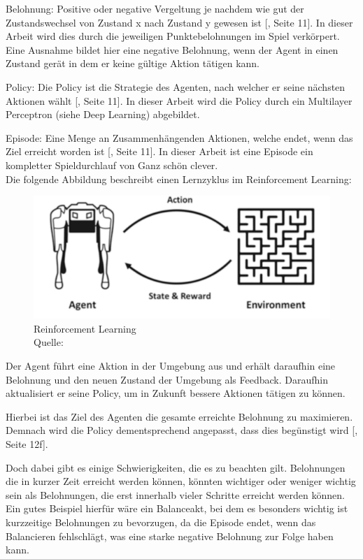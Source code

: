 Belohnung: Positive oder negative Vergeltung je nachdem wie gut der Zustandswechsel von Zustand x nach Zustand y gewesen ist [\cite{ris-ala_fundamentals_2023}, Seite 11]. In dieser Arbeit wird dies durch die jeweiligen Punktebelohnungen im Spiel verkörpert. Eine Ausnahme bildet hier eine negative Belohnung, wenn der Agent in einen Zustand gerät in dem er keine gültige Aktion tätigen kann.

Policy: Die Policy ist die Strategie des Agenten, nach welcher er seine nächsten Aktionen wählt [\cite{ris-ala_fundamentals_2023}, Seite 11]. In dieser Arbeit wird die Policy durch ein Multilayer Perceptron (siehe Deep Learning) abgebildet.

Episode: Eine Menge an Zusammenhängenden Aktionen, welche endet, wenn das Ziel erreicht worden ist [\cite{ris-ala_fundamentals_2023}, Seite 11]. In dieser Arbeit ist eine Episode ein kompletter Spieldurchlauf von Ganz schön clever.\\

	Die folgende Abbildung beschreibt einen Lernzyklus im Reinforcement Learning:
\nopagebreak
\begin{figure}[h]
\includegraphics[width=1\textwidth]{Bilder/rl} 
\caption[Reinforcement Learning]{Reinforcement Learning\\ Quelle: \cite{ris-ala_fundamentals_2023}}
\end{figure}

Der Agent führt eine Aktion in der Umgebung aus und erhält daraufhin eine Belohnung und den neuen Zustand der Umgebung als Feedback. Daraufhin aktualisiert er seine Policy, um in Zukunft bessere Aktionen tätigen zu können.

Hierbei ist das Ziel des Agenten die gesamte erreichte Belohnung zu maximieren. Demnach wird die Policy dementsprechend angepasst, dass dies begünstigt wird [\cite{ris-ala_fundamentals_2023}, Seite 12f].

Doch dabei gibt es einige Schwierigkeiten, die es zu beachten gilt. Belohnungen die in kurzer Zeit erreicht werden können, könnten wichtiger oder weniger wichtig sein als Belohnungen, die erst innerhalb vieler Schritte erreicht werden können. Ein gutes Beispiel hierfür wäre ein Balanceakt, bei dem es besonders wichtig ist kurzzeitige Belohnungen zu bevorzugen, da die Episode endet, wenn das Balancieren fehlschlägt, was eine starke negative Belohnung zur Folge haben kann.

